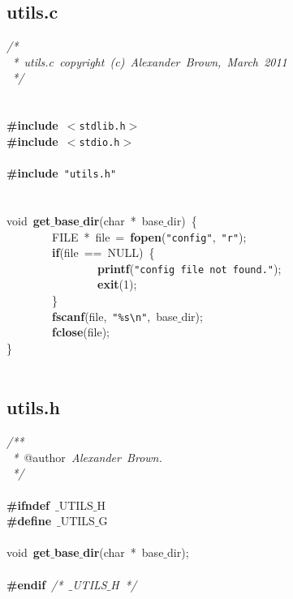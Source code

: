 \subsection{utils.c}
\scriptsize
\sffamily
\noindent
\mbox{}\textit{/*} \\
\mbox{}\textit{\ *\ utils.c\ copyright\ (c)\ Alexander\ Brown,\ March\ 2011} \\
\mbox{}\textit{\ */} \\
\mbox{} \\
\mbox{} \\
\mbox{}\textbf{\#include}\ \texttt{$<$stdlib.h$>$} \\
\mbox{}\textbf{\#include}\ \texttt{$<$stdio.h$>$} \\
\mbox{} \\
\mbox{}\textbf{\#include}\ \texttt{"{}utils.h"{}} \\
\mbox{} \\
\mbox{} \\
\mbox{}void\ \textbf{get$\_$base$\_$dir}(char\ *\ base$\_$dir)\ \{ \\
\mbox{}\ \ \ \ \ \ \ \ FILE\ *\ file\ =\ \textbf{fopen}(\texttt{"{}config"{}},\ \texttt{"{}r"{}}); \\
\mbox{}\ \ \ \ \ \ \ \ \textbf{if}(file\ ==\ NULL)\ \{ \\
\mbox{}\ \ \ \ \ \ \ \ \ \ \ \ \ \ \ \ \textbf{printf}(\texttt{"{}config\ file\ not\ found."{}}); \\
\mbox{}\ \ \ \ \ \ \ \ \ \ \ \ \ \ \ \ \textbf{exit}(1); \\
\mbox{}\ \ \ \ \ \ \ \ \} \\
\mbox{}\ \ \ \ \ \ \ \ \textbf{fscanf}(file,\ \texttt{"{}\%s}\texttt{\textbackslash{}n}\texttt{"{}},\ base$\_$dir); \\
\mbox{}\ \ \ \ \ \ \ \ \textbf{fclose}(file); \\
\mbox{}\} \\
\mbox{} \\

\clearpage
\normalsize
\rmfamily
\subsection{utils.h}
\scriptsize
\sffamily
\noindent
\mbox{}\textit{/**} \\
\mbox{}\textit{\ *\ }@author\textit{\ Alexander\ Brown.} \\
\mbox{}\textit{\ */} \\
\mbox{} \\
\mbox{}\textbf{\#ifndef}\ $\_$UTILS$\_$H \\
\mbox{}\textbf{\#define}\ $\_$UTILS$\_$G \\
\mbox{} \\
\mbox{}void\ \textbf{get$\_$base$\_$dir}(char\ *\ base$\_$dir); \\
\mbox{} \\
\mbox{}\textbf{\#endif}\ \textit{/*\ $\_$UTILS$\_$H\ */} \\

\clearpage
